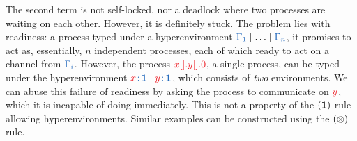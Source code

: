 \documentclass[copyright,creativecommons]{eptcs}
\begin{document}
The second term is not self-locked, nor a deadlock where two processes are waiting on each other. However, it is definitely stuck. The problem lies with readiness: a process typed under a hyperenvironment $\ty{\Gamma_1}\hsep\dots\hsep\ty{\Gamma_n}$, it promises to act as, essentially, $n$ independent processes, each of which ready to act on a channel from $\ty{\Gamma_i}$. However, the process $\tm{\piBoundSend{x}{}{\piBoundSend{y}{}{\piHalt}}}$, a single process, can be typed under the hyperenvironment $\ty{\tmty{x}{\one} \hsep \tmty{y}{\one}}$, which consists of \emph{two} environments. We can abuse this failure of readiness by asking the process to communicate on $\tm{y}$, which it is incapable of doing immediately. This is not a property of the $(\mathbf{1})$ rule allowing hyperenvironments. Similar examples can be constructed using the $(\otimes)$ rule.
\end{document}
